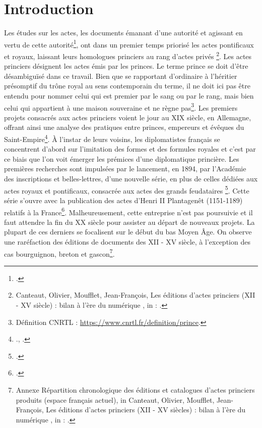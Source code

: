 \chapter{Introduction} 

\par Les études sur les actes, les documents émanant d'une autorité et agissant en vertu de cette autorité\footnote{\cite{guyotjeanninDiplomatiqueMedievale2006}.}, ont dans un premier temps priorisé les actes pontificaux et royaux, \og laissant leurs homologues princiers au rang d'actes privés \fg  \footnote{Canteaut, Olivier, Moufflet, Jean-François, \og Les éditions d'actes princiers (\textsc{XII} - \textsc{XV} siècle) : bilan à l'ère du numérique \fg, in : \cite{guyotjeanninJeanBerryEcrit2019}.}. Les actes princiers désignent les actes émis par les princes. Le terme prince se doit d'être désambiguïsé dans ce travail. Bien que se rapportant d'ordinaire à l'héritier présomptif du trône royal au sens contemporain du terme, il ne doit ici pas être entendu pour nommer celui qui est premier par le sang ou par le rang, mais bien celui qui appartient à une maison souveraine et ne règne pas\footnote{Définition CNRTL :  \url{https://www.cnrtl.fr/definition/prince}.}. Les premiers projets consacrés aux actes princiers voient le jour au \textsc{XIX} siècle, en Allemagne, offrant ainsi une analyse des pratiques entre princes, empereurs et évêques du Saint-Empire\footnote{\cite{bohmerRegestaImperiiInde1839}., \cite{hueberRegestenKaiserreichsUnter1877}.}. À l'instar de leurs voisins, les diplomatistes français se concentrent d'abord sur l'imitation des formes et des formules royales et c'est par ce biais que l'on voit émerger les prémices d'une diplomatique princière. Les premières recherches sont impulsées par le lancement, en 1894, par l'Académie des inscriptions et belles-lettres, d'une nouvelle série, en plus de celles dédiées aux actes royaux et pontificaux, consacrée aux actes des \og grands feudataires \fg\footnote{\cite{guyotjeanninJeanBerryEcrit2019}.}. Cette série s'ouvre avec la publication des actes d'Henri II Plantagenêt (1151-1189) relatifs à la France\footnote{\cite{delisleRecueilActesHenri1909}.}. Malheureusement, cette entreprise n'est pas poursuivie et il faut attendre la fin du XX siècle pour assister au départ de nouveaux projets. La plupart de ces derniers se focalisent sur le début du bas Moyen Âge. On observe une raréfaction des éditions de documents des \textsc{XII} - \textsc{XV} siècle, à l'exception des cas bourguignon, breton et gascon\footnote{Annexe Répartition chronologique des éditions et catalogues d'actes princiers produits (espace français actuel), in Canteaut, Olivier, Moufflet, Jean-François, \og Les éditions d’actes princiers (\textsc{XII} - \textsc{XV} siècles) : bilan à l’ère du numérique \fg , in : \cite{guyotjeanninJeanBerryEcrit2019}.}. 

